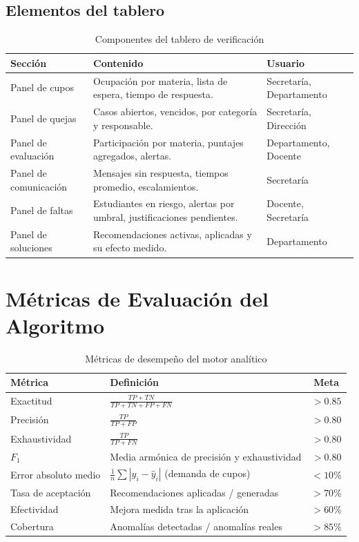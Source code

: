\subsection{Elementos del tablero}
\begin{table}[H]
\centering
\caption{Componentes del tablero de verificación}
\label{tab:tablero}
\small
\begin{tabularx}{\textwidth}{@{}p{3.3cm} X p{3.1cm}@{}}
\toprule
\rowcolor{moradoClaro}
\textbf{Sección} & \textbf{Contenido} & \textbf{Usuario} \\
\midrule
Panel de cupos & Ocupación por materia, lista de espera, tiempo de respuesta. & Secretaría, Departamento \\
Panel de quejas & Casos abiertos, vencidos, por categoría y responsable. & Secretaría, Dirección \\
Panel de evaluación & Participación por materia, puntajes agregados, alertas. & Departamento, Docente \\
Panel de comunicación & Mensajes sin respuesta, tiempos promedio, escalamientos. & Secretaría \\
Panel de faltas & Estudiantes en riesgo, alertas por umbral, justificaciones pendientes. & Docente, Secretaría \\
Panel de soluciones & Recomendaciones activas, aplicadas y su efecto medido. & Departamento \\
\bottomrule
\end{tabularx}
\end{table}

\section{Métricas de Evaluación del Algoritmo}

\begin{table}[H]
\centering
\caption{Métricas de desempeño del motor analítico}
\label{tab:metricas-algoritmo}
\small
\begin{tabularx}{\textwidth}{@{}p{3.6cm} X c@{}}
\toprule
\rowcolor{azulClaro}
\textbf{Métrica} & \textbf{Definición} & \textbf{Meta} \\
\midrule
Exactitud & $\frac{TP+TN}{TP+TN+FP+FN}$ & $> 0.85$ \\
Precisión & $\frac{TP}{TP+FP}$ & $> 0.80$ \\
Exhaustividad & $\frac{TP}{TP+FN}$ & $> 0.80$ \\
$F_1$ & Media armónica de precisión y exhaustividad & $> 0.80$ \\
Error absoluto medio & $\frac{1}{n}\sum |y_i - \hat{y}_i|$ (demanda de cupos) & $< 10\%$ \\
Tasa de aceptación & Recomendaciones aplicadas / generadas & $> 70\%$ \\
Efectividad & Mejora medida tras la aplicación & $> 60\%$ \\
Cobertura & Anomalías detectadas / anomalías reales & $> 85\%$ \\
\bottomrule
\end{tabularx}
\end{table}

